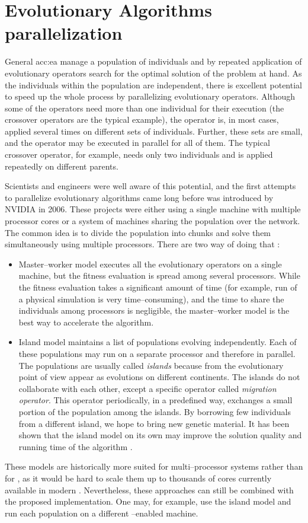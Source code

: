 \section{Evolutionary Algorithms parallelization}

General \acrlong{acc:ea} manage a population of individuals and by repeated application of evolutionary operators search for the optimal solution of the problem at hand. As the individuals within the population are independent, there is excellent potential to speed up the whole process by parallelizing evolutionary operators. Although some of the operators need more than one individual for their execution (the crossover operators are the typical example), the operator is, in most cases, applied several times on different sets of individuals. Further, these sets are small, and the operator may be executed in parallel for all of them. The typical crossover operator, for example, needs only two individuals and is applied repeatedly on different parents.

Scientists and engineers were well aware of this potential, and the first attempts \citep{PGAPack} to parallelize evolutionary algorithms came long before \cuda was introduced by NVIDIA in 2006. These projects were either using a single machine with multiple processor cores or a system of machines sharing the population over the network. The common idea is to divide the population into chunks and solve them simultaneously using multiple processors. There are two way of doing that \citep{CHENG2019514}:
\begin{itemize}
    \item Master--worker model executes all the evolutionary operators on a single machine, but the fitness evaluation is spread among several processors. While the fitness evaluation takes a significant amount of time (for example, run of a physical simulation is very time--consuming), and the time to share the individuals among processors is negligible, the master--worker model is the best way to accelerate the algorithm.
    \item Island model maintains a list of populations evolving independently. Each of these populations may run on a separate processor and therefore in parallel. The populations are usually called \emph{islands} because from the evolutionary point of view appear as evolutions on different continents. The islands do not collaborate with each other, except a specific operator called \emph{migration operator}. This operator periodically, in a predefined way, exchanges a small portion of the population among the islands. By borrowing few individuals from a different island, we hope to bring new genetic material. It has been shown that the island model on its own may improve the solution quality and running time of the algorithm \citep{IslandModel}.
\end{itemize}
These models are historically more suited for multi--processor systems rather than for \gpuns, as it would be hard to scale them up to thousands of cores currently available in modern \gpuns. Nevertheless, these approaches can still be combined with the proposed implementation. One may, for example, use the island model and run each population on a different \gpuns--enabled machine.

